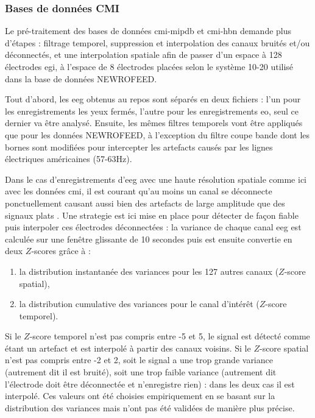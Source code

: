 \subsubsection{Bases de données CMI} \label{treatment_cmi_databases}

Le pré-traitement des bases de données \gls{cmi-mipdb} et \gls{cmi-hbn} demande plus d'étapes : filtrage temporel, suppression et 
interpolation des canaux bruités et/ou déconnectés, et une interpolation spatiale afin de passer d'un espace à 128 électrodes \gls{egi},
à l'espace de 8 électrodes placées selon le système 10-20 utilisé dans la base de données NEWROFEED.

Tout d'abord, les \gls{eeg} obtenus au repos sont séparés en deux fichiers : l'un pour les enregistrements les yeux fermés, 
l'autre pour les enregistrements \gls{eo}, seul ce dernier va être analysé. Ensuite, les mêmes filtres temporels vont être appliqués
que pour les données NEWROFEED, à l'exception du filtre coupe bande dont les bornes sont modifiées pour intercepter les artefacts 
causés par les lignes électriques américaines (57-63Hz).

Dans le cas d'enregistrements d'\gls{eeg} avec une haute résolution spatiale comme ici avec les données \gls{cmi}, 
il est courant qu'au moins un canal se déconnecte ponctuellement causant aussi bien des artefacts de large amplitude que des signaux plats \citep{Barlow1986, Oregan2013}. 
Une strategie est ici mise en place pour détecter de façon fiable puis interpoler ces électrodes déconnectées : la variance de chaque canal 
\gls{eeg} est calculée sur une fenêtre glissante de 10 secondes puis est ensuite convertie en deux $Z$-scores grâce à :
\begin{enumerate}
\item la distribution instantanée des variances pour les 127 autres canaux ($Z$-score spatial),
\item la distribution cumulative des variances pour le canal d'intérêt ($Z$-score temporel).
\end{enumerate}
Si le $Z$-score temporel n'est pas compris entre -5 et 5, le signal est détecté comme étant un artefact et est interpolé à partir des canaux voisins.
Si le $Z$-score spatial n'est pas compris entre -2 et 2, soit le signal a une trop grande variance (autrement dit il est bruité), soit une trop faible
variance (autrement dit l'électrode doit être déconnectée et n'enregistre rien) : dans les deux cas il est interpolé. Ces valeurs ont été choisies
empiriquement en se basant sur la distribution des variances mais n'ont pas été validées de manière plus précise.  


